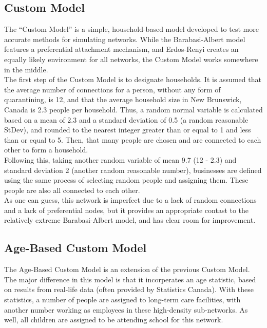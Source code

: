 \documentclass{article}
\numberwithin{equation}{section} %
\begin{document}
\begin{multicols}{2}
  \subsection{Custom Model}
  \label{Appendix B: Custom Model}
  The ``Custom Model'' is a simple, household-based model developed to test more accurate methods for simulating networks. While the Barabasi-Albert model features a preferential attachment mechanism, and Erdos-Renyi creates an equally likely environment for all networks, the Custom Model works somewhere in the middle. \\

  The first step of the Custom Model is to designate households. It is assumed that the average number of connections for a person, without any form of quarantining, is 12, and that the average household size in New Brunswick, Canada is 2.3 people per household.\cite{NBHouseSize} Thus, a random normal variable is calculated based on a mean of 2.3 and a standard deviation of 0.5 (a random reasonable StDev), and rounded to the nearest integer greater than or equal to 1 and less than or equal to 5. Then, that many people are chosen and are connected to each other to form a household. \\

  Following this, taking another random variable of mean 9.7 (12 - 2.3) and standard deviation 2 (another random reasonable number), businesses are defined using the same process of selecting random people and assigning them. These people are also all connected to each other. \\

  As one can guess, this network is imperfect due to a lack of random connections and a lack of preferential nodes, but it provides an appropriate contast to the relatively extreme Barabasi-Albert model, and has clear room for improvement.

  \subsection{Age-Based Custom Model}
  \label{Appendix B: AB Custom Model}
  The Age-Based Custom Model is an extension of the previous Custom Model. The major difference in this model is that it incorperates an age statistic, based on results from real-life data (often provided by Statistics Canada). With these statistics, a number of people are assigned to long-term care facilities, with another number working as employees in these high-density sub-networks. As well, all children are assigned to be attending school for this network. \\


\end{multicols}
\end{document}
